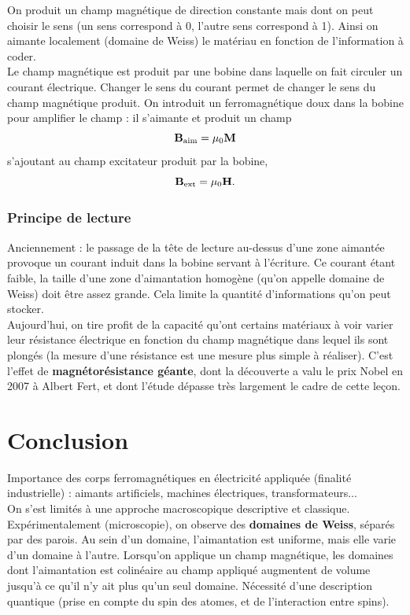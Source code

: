 \documentclass[11pt,a4paper]{report}
\begin{document}
On produit un champ magnétique de direction constante mais dont on peut choisir le sens (un sens correspond à 0, l'autre sens correspond à 1). Ainsi on aimante localement (domaine de Weiss) le matériau en fonction de l'information à coder.\\

Le champ magnétique est produit par une bobine dans laquelle on fait circuler un courant électrique. Changer le sens du courant permet de changer le sens du champ magnétique produit. On introduit un ferromagnétique doux dans la bobine pour amplifier le champ : il s'aimante et produit un champ 
\begin{equation}
	\bold{B}_\text{aim} = \mu_0 \bold{M}
\end{equation}
s'ajoutant au champ excitateur produit par la bobine,
\begin{equation}
	\bold{B}_\text{ext} = \mu_0 \bold{H}.
\end{equation}

\subsubsection{Principe de lecture}
Anciennement : le passage de la tête de lecture au-dessus d'une zone aimantée provoque un courant induit dans la bobine servant à l'écriture. Ce courant étant faible, la taille d'une zone d'aimantation  homogène (qu'on appelle domaine de Weiss) doit être assez grande. Cela limite la quantité d'informations qu'on peut stocker.\\

Aujourd'hui, on tire profit de la capacité qu'ont certains matériaux à voir varier leur résistance électrique en fonction du champ magnétique dans lequel ils sont plongés (la mesure d'une résistance est une mesure plus simple à réaliser). C'est l'effet de \textbf{magnétorésistance géante}, dont la découverte a valu le prix Nobel en 2007 à Albert Fert, et dont l'étude dépasse très largement le cadre de cette leçon.

\section*{Conclusion}

Importance des corps ferromagnétiques en électricité appliquée (finalité industrielle) : aimants artificiels, machines électriques, transformateurs...\\ 

On s'est limités à une approche macroscopique descriptive et classique. Expérimentalement (microscopie), on observe des \textbf{domaines de Weiss}, séparés par des parois. Au sein d'un domaine, l'aimantation est uniforme, mais elle varie d'un domaine à l'autre. Lorsqu'on applique un champ magnétique, les domaines dont l'aimantation est colinéaire au champ appliqué augmentent de volume jusqu'à ce qu'il n'y ait plus qu'un seul domaine. Nécessité d'une description quantique (prise en compte du spin des atomes, et de l'interaction entre spins).\\
\end{document}
